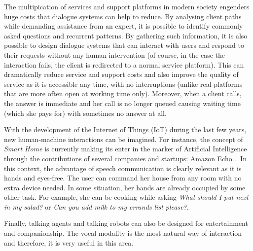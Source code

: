         The multipication of services and support platforms in modern society engenders huge costs that dialogue systems can help to reduce. By analysing client paths while demanding assistance from an expert, it is possible to identify commonly asked questions and recurrent patterns. By gathering such information, it is also possible to design dialogue systems that can interact with users and respond to their requests without any human intervention (of course, in the case the interaction fails, the client is redirected to a normal service platform). This can dramatically reduce service and support costs and also improve the quality of service as it is accessible any time, with no interruptions (unlike real platforms that are more often open at working time only). Moreover, when a client calls, the answer is immediate and her call is no longer queued causing waiting time (which she pays for) with sometimes no answer at all.

	With the development of the Internet of Things (IoT) during the last few years, new human-machine interactions can be imagined. For instance, the concept of \textit{Smart Home} is currently making its enter in the marker of Artificial Intelligence through the contributions of several companies and startups: Amazon Echo... In this context, the advantage of speech communication is clearly relevant as it is hands and eyes-free. The user can command her house from any room with no extra device needed. In some situation, her hands are already occupied by some other task. For example, she can be cooking \cite{Laroche2013} while asking \textit{What should I put next in my salad?} or \textit{Can you add milk to my errands list please?}.

        Finally, talking agents and talking robots can also be designed for entertainment and companionship. The vocal modality is the most natural way of interaction and therefore, it is very useful in this area.


